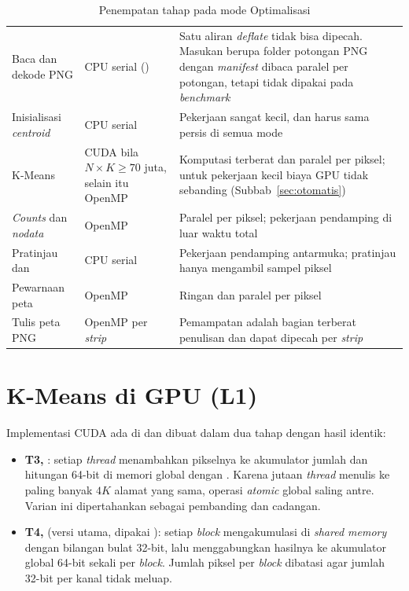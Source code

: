 \begin{table}[H]
\centering
\caption{Penempatan tahap pada mode Optimalisasi}
\label{tab:penempatan}
\begin{tabularx}{\textwidth}{|L{3.2cm}|L{3.6cm}|Y|}
\hline
{} &  &  \\ \hline
Baca dan dekode PNG & CPU serial () & Satu aliran \emph{deflate} tidak bisa dipecah. Masukan berupa folder potongan PNG dengan \emph{manifest} dibaca paralel per potongan, tetapi tidak dipakai pada \emph{benchmark} \\ \hline
Inisialisasi \emph{centroid} & CPU serial & Pekerjaan sangat kecil, dan harus sama persis di semua mode \\ \hline
K-Means & CUDA bila $N \times K \geq 70$ juta, selain itu OpenMP & Komputasi terberat dan paralel per piksel; untuk pekerjaan kecil biaya GPU tidak sebanding (Subbab~\ref{sec:otomatis}) \\ \hline
\emph{Counts} dan \emph{nodata} & OpenMP & Paralel per piksel; pekerjaan pendamping di luar waktu total \\ \hline
Pratinjau dan  & CPU serial & Pekerjaan pendamping antarmuka; pratinjau hanya mengambil sampel piksel \\ \hline
Pewarnaan peta & OpenMP & Ringan dan paralel per piksel \\ \hline
Tulis peta PNG & OpenMP per \emph{strip} & Pemampatan adalah bagian terberat penulisan dan dapat dipecah per \emph{strip} \\ \hline
\end{tabularx}
\end{table}

\section{K-Means di GPU (L1)}
\label{sec:cuda}
Implementasi CUDA ada di  dan dibuat dalam dua tahap dengan hasil identik:
\begin{itemize}
    \item \textbf{T3, }: setiap \emph{thread} menambahkan pikselnya ke akumulator jumlah dan hitungan 64-bit di memori global dengan . Karena jutaan \emph{thread} menulis ke paling banyak $4K$ alamat yang sama, operasi \emph{atomic} global saling antre. Varian ini dipertahankan sebagai pembanding dan cadangan.
    \item \textbf{T4, } (versi utama, dipakai ): setiap \emph{block} mengakumulasi di \emph{shared memory} dengan bilangan bulat 32-bit, lalu menggabungkan hasilnya ke akumulator global 64-bit sekali per \emph{block}. Jumlah piksel per \emph{block} dibatasi agar jumlah 32-bit per kanal tidak meluap.
\end{itemize}

